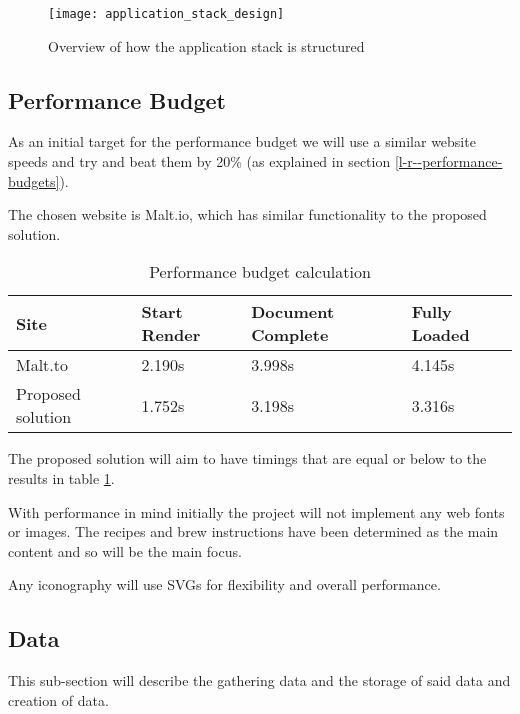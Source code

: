 \begin{figure}[H]
  \centering
    \texttt{[image: application\_stack\_design]}
  \caption{Overview of how the application stack is structured}
  \label{figure-application-stack-design}
\end{figure}

\subsection{Performance Budget}

As an initial target for the performance budget we will use a similar website speeds and try and beat them by 20\% (as explained in section \ref{l-r--performance-budgets}).

The chosen website is Malt.io, which has similar functionality to the proposed solution.

\begin{table}[H]
\centering
\begin{tabular}{|l|l|l|l|}
\hline
\textbf{Site}     & \textbf{Start Render} & \textbf{Document Complete} & \textbf{Fully Loaded} \\ \hline
Malt.to           & 2.190s                & 3.998s                     & 4.145s                \\ \hline
Proposed solution & 1.752s                & 3.198s                     & 3.316s                \\ \hline
\end{tabular}
\caption{Performance budget calculation}
\label{table-performance-budget}
\end{table}

The proposed solution will aim to have timings that are equal or below to the results in table \ref{table-performance-budget}.

With performance in mind initially the project will not implement any web fonts or images. The recipes and brew instructions have been determined as the main content and so will be the main focus.

Any iconography will use SVGs for flexibility and overall performance.

\subsection{Data} \label{a-d--data}

This sub-section will describe the gathering data and the storage of said data and creation of data.

